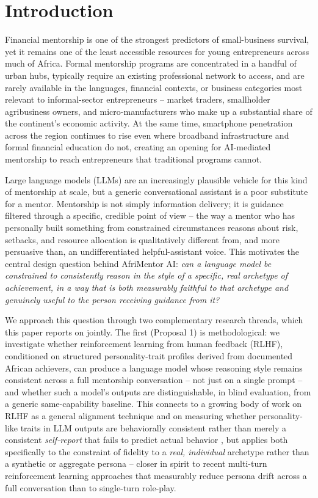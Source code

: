 \section{Introduction}
\label{sec:introduction}

Financial mentorship is one of the strongest predictors of small-business survival, yet it remains one of the least accessible resources for young entrepreneurs across much of Africa. Formal mentorship programs are concentrated in a handful of urban hubs, typically require an existing professional network to access, and are rarely available in the languages, financial contexts, or business categories most relevant to informal-sector entrepreneurs -- market traders, smallholder agribusiness owners, and micro-manufacturers who make up a substantial share of the continent's economic activity. At the same time, smartphone penetration across the region continues to rise even where broadband infrastructure and formal financial education do not, creating an opening for AI-mediated mentorship to reach entrepreneurs that traditional programs cannot.

Large language models (LLMs) are an increasingly plausible vehicle for this kind of mentorship at scale, but a generic conversational assistant is a poor substitute for a mentor. Mentorship is not simply information delivery; it is guidance filtered through a specific, credible point of view -- the way a mentor who has personally built something from constrained circumstances reasons about risk, setbacks, and resource allocation is qualitatively different from, and more persuasive than, an undifferentiated helpful-assistant voice. This motivates the central design question behind AfriMentor AI: \emph{can a language model be constrained to consistently reason in the style of a specific, real archetype of achievement, in a way that is both measurably faithful to that archetype and genuinely useful to the person receiving guidance from it?}

We approach this question through two complementary research threads, which this paper reports on jointly. The first (Proposal 1) is methodological: we investigate whether reinforcement learning from human feedback (RLHF), conditioned on structured personality-trait profiles derived from documented African achievers, can produce a language model whose reasoning style remains consistent across a full mentorship conversation -- not just on a single prompt -- and whether such a model's outputs are distinguishable, in blind evaluation, from a generic same-capability baseline. This connects to a growing body of work on RLHF as a general alignment technique \citep{bai2022helpful,chaudhari2024rlhf} and on measuring whether personality-like traits in LLM outputs are behaviorally consistent rather than merely a consistent \emph{self-report} that fails to predict actual behavior \citep{lee2024trait,han2025illusion,jiang2023personallm}, but applies both specifically to the constraint of fidelity to a \emph{real, individual} archetype rather than a synthetic or aggregate persona -- closer in spirit to recent multi-turn reinforcement learning approaches that measurably reduce persona drift across a full conversation \citep{abdulhai2025personas} than to single-turn role-play.


